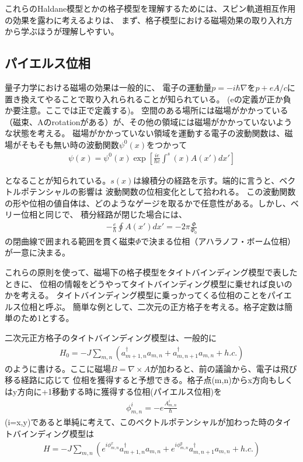 \documentclass{article}
\begin{document}
これらのHaldane模型とかの格子模型を理解するためには、スピン軌道相互作用の効果を露わに考えるよりは、
まず、格子模型における磁場効果の取り入れ方から学ぶほうが理解しやすい。

\subsection{パイエルス位相}
量子力学における磁場の効果は一般的に、
電子の運動量$p=-i\hbar \nabla$を$p+eA/c$に置き換えてやることで取り入れられることが知られている。
(eの定義が正か負か要注意。ここでは正で定義する)。
空間のある場所には磁場がかかっている（磁束、Aのrotationがある）が、その他の領域には磁場がかかっていないような状態を考える。
磁場がかかっていない領域を運動する電子の波動関数は、磁場がそもそも無い時の波動関数$\psi^0(x)$をつかって
\begin{eqnarray}
\psi(x)=\psi^0(x) \exp \left[\frac{ie}{\hbar c}\int^s(x) A(x')dx'\right]
\end{eqnarray}

となることが知られている。$s(x)$は線積分の経路を示す。端的に言うと、ベクトルポテンシャルの影響は
波動関数の位相変化として拾われる。
この波動関数の形や位相の値自体は、どのようなゲージを取るかで任意性がある。しかし、ベリー位相と同じで、
積分経路が閉じた場合には、
\begin{eqnarray}
-\frac{e}{h}\oint A(x')dx' =-2\pi \frac{\Phi}{\Phi_0}
\end{eqnarray}
の閉曲線で囲まれる範囲を貫く磁束$\Phi$で決まる位相（アハラノフ・ボーム位相）が一意に決まる。

これらの原則を使って、磁場下の格子模型をタイトバインディング模型で表したときに、
位相の情報をどうやってタイトバインディング模型に乗せれば良いのかを考える。
タイトバインディング模型に乗っかってくる位相のことをパイエルス位相と呼ぶ。
簡単な例として、二次元の正方格子を考える。格子定数は簡単のため1とする。

二次元正方格子のタイトバインディング模型は、一般的に
\begin{eqnarray}
H_0=-J\sum_{m,n} \left(a_{m+1,n}^\dagger a_{m,n}+a_{m,n+1}^\dagger a_{m,n}+
h.c.\right)
\end{eqnarray}
のように書ける。ここに磁場$B=\nabla\times A$が加わると、前の議論から、電子は飛び移る経路に応じて
位相を獲得すると予想できる。格子点(m,n)からx方向もしくはy方向に+1移動する時に獲得する位相(パイエルス位相)を
\begin{eqnarray}
\phi_{m,n}^i=-e\frac{A_{m,n}^i}{\hbar} 
\end{eqnarray}
(i=x,y)であると単純に考えて、このベクトルポテンシャルが加わった時のタイトバインディング模型は
\begin{eqnarray}
H=-J\sum_{m,n} \left(e^{i\phi_{m,n}^x}a_{m+1,n}^\dagger
a_{m,n}+e^{i\phi_{m,n}^y}a_{m,n+1}^\dagger a_{m,n}+ h.c.\right)
\label{H}
\end{eqnarray}
\end{document}
